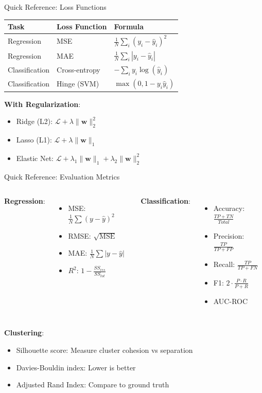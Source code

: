 \documentclass[aspectratio=169,11pt]{beamer}
\newcommand{\w}{\mathbf{w}}
\begin{document}
\begin{frame}{Quick Reference: Loss Functions}
\begin{center}
\begin{tabular}{lll}
\toprule
\textbf{Task} & \textbf{Loss Function} & \textbf{Formula} \\
\midrule
Regression & MSE & $\frac{1}{N}\sum_i (y_i - \hat{y}_i)^2$ \\
Regression & MAE & $\frac{1}{N}\sum_i |y_i - \hat{y}_i|$ \\
Classification & Cross-entropy & $-\sum_i y_i \log(\hat{y}_i)$ \\
Classification & Hinge (SVM) & $\max(0, 1 - y_i \hat{y}_i)$ \\
\bottomrule
\end{tabular}
\end{center}

\vspace{1em}
\textbf{With Regularization}:
\begin{itemize}
    \item Ridge (L2): $\mathcal{L} + \lambda \|\w\|_2^2$
    \item Lasso (L1): $\mathcal{L} + \lambda \|\w\|_1$
    \item Elastic Net: $\mathcal{L} + \lambda_1 \|\w\|_1 + \lambda_2 \|\w\|_2^2$
\end{itemize}
\end{frame}

\begin{frame}{Quick Reference: Evaluation Metrics}
\begin{columns}
\textbf{Regression}:
\begin{itemize}
    \item MSE: $\frac{1}{N}\sum(y - \hat{y})^2$
    \item RMSE: $\sqrt{\text{MSE}}$
    \item MAE: $\frac{1}{N}\sum|y - \hat{y}|$
    \item $R^2$: $1 - \frac{SS_{res}}{SS_{tot}}$
\end{itemize}

\textbf{Classification}:
\begin{itemize}
    \item Accuracy: $\frac{TP + TN}{Total}$
    \item Precision: $\frac{TP}{TP + FP}$
    \item Recall: $\frac{TP}{TP + FN}$
    \item F1: $2 \cdot \frac{P \cdot R}{P + R}$
    \item AUC-ROC
\end{itemize}
\end{columns}

\vspace{1em}
\textbf{Clustering}:
\begin{itemize}
    \item Silhouette score: Measure cluster cohesion vs separation
    \item Davies-Bouldin index: Lower is better
    \item Adjusted Rand Index: Compare to ground truth
\end{itemize}
\end{frame}
\end{document}
